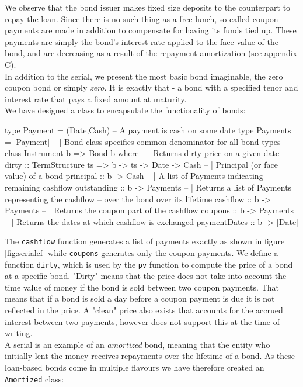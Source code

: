 We observe that the bond issuer makes fixed size deposits to the counterpart to 
repay the loan. Since there is no such thing as a free lunch, so-called coupon 
payments are made in addition to compensate for having its funds tied up. These
payments are simply the bond's interest rate applied to the face value of the
bond, and are decreasing as a result of the repayment amortization 
(see appendix C).\\

In addition to the serial, we present the most basic bond imaginable, the zero 
coupon bond or simply \emph{zero}. It is exactly that - a bond with a specified 
tenor and interest rate that pays a fixed amount at maturity.\\

We have designed a class to encapsulate the functionality of bonds:

\begin{hscode}
type Payment = (Date,Cash) -- A payment is cash on some date
type Payments = [Payment]
-- | Bond class specifies common denominator for all bond types 
class Instrument b => Bond b where
  -- | Returns dirty price on a given date
  dirty :: TermStructure ts => b -> ts -> Date -> Cash
  -- | Principal (or face value) of a bond
  principal    :: b -> Cash
  -- | A list of Payments indicating remaining cashflow
  outstanding  :: b -> Payments
  -- | Returns a list of Payments representing the cashflow
  -- over the bond over its lifetime
  cashflow     :: b -> Payments
  -- | Returns the coupon part of the cashflow
  coupons      :: b -> Payments
  -- | Returns the dates at which cashflow is exchanged
  paymentDates :: b -> [Date]
\end{hscode}

The \texttt{cashflow} function generates a list of payments exactly as shown
in figure \ref{fig:serialcf} while \texttt{coupons} generates only the coupon
payments. We define a function \texttt{dirty}, which is used by the \texttt{pv}
function to compute the price of a bond at a specific bond. "Dirty" means that
the price does not take into account the time value of money if the bond is
sold between two coupon payments. That means that if a bond is sold a day before
a coupon payment is due it is not reflected in the price. A "clean" price also
exists that accounts for the accrued interest between two payments, however
\hql does not support this at the time of writing.\\

A serial is an example of an \emph{amortized} bond, meaning that the entity
who initially lent the money receives repayments over
the lifetime of a bond. As these loan-based bonds come in multiple flavours
we have therefore created an \texttt{Amortized} class:

